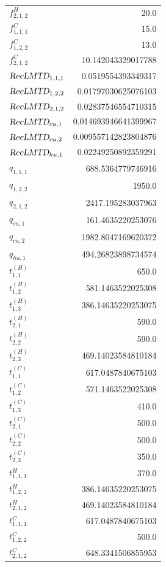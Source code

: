 \documentclass{article}%
\begin{document}
\begin{multicols*}{3}
\begin{supertabular}{lr}
	$f_{2,1,2}^{H}$ & 20.0 \\%
	$f_{1,1,1}^{C}$ & 15.0 \\%
	$f_{1,2,2}^{C}$ & 13.0 \\%
	$f_{2,1,2}^{C}$ & 10.142043329017788 \\%
	$\textsl{RecLMTD}_{1,1,1}$ & 0.0519554393349317 \\%
	$\textsl{RecLMTD}_{1,2,2}$ & 0.01797030625076103 \\%
	$\textsl{RecLMTD}_{2,1,2}$ & 0.02837546554710315 \\%
	$\textsl{RecLMTD}_{cu,1}$ & 0.014693946641399967 \\%
	$\textsl{RecLMTD}_{cu,2}$ & 0.009557142823804876 \\%
	$\textsl{RecLMTD}_{hu,1}$ & 0.02249250892359291 \\%
	$q_{1,1,1}$ & 688.5364779746916 \\%
	$q_{1,2,2}$ & 1950.0 \\%
	$q_{2,1,2}$ & 2417.195283037963 \\%
	$q_{cu,1}$ & 161.4635220253076 \\%
	$q_{cu,2}$ & 1982.8047169620372 \\%
	$q_{hu,1}$ & 494.26823898734574 \\%
	$t_{1,1}^{(H)}$ & 650.0 \\%
	$t_{1,2}^{(H)}$ & 581.1463522025308 \\%
	$t_{1,3}^{(H)}$ & 386.14635220253075 \\%
	$t_{2,1}^{(H)}$ & 590.0 \\%
	$t_{2,2}^{(H)}$ & 590.0 \\%
	$t_{2,3}^{(H)}$ & 469.14023584810184 \\%
	$t_{1,1}^{(C)}$ & 617.0487840675103 \\%
	$t_{1,2}^{(C)}$ & 571.1463522025308 \\%
	$t_{1,3}^{(C)}$ & 410.0 \\%
	$t_{2,1}^{(C)}$ & 500.0 \\%
	$t_{2,2}^{(C)}$ & 500.0 \\%
	$t_{2,3}^{(C)}$ & 350.0 \\%
	$t_{1,1,1}^{H}$ & 370.0 \\%
	$t_{1,2,2}^{H}$ & 386.14635220253075 \\%
	$t_{2,1,2}^{H}$ & 469.14023584810184 \\%
	$t_{1,1,1}^{C}$ & 617.0487840675103 \\%
	$t_{1,2,2}^{C}$ & 500.0 \\%
	$t_{2,1,2}^{C}$ & 648.3341506855953 \\%

\end{supertabular}
\end{multicols*}
\end{document}
